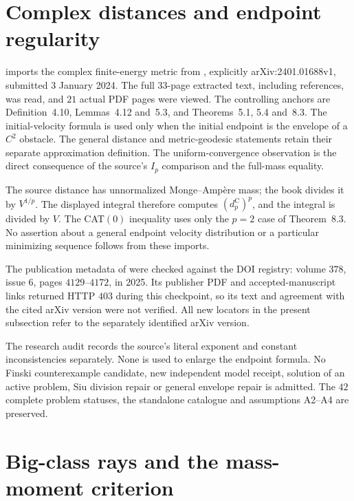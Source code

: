 \section{Complex distances and endpoint regularity}
\label{sec:provenance-complex-geodesic-regularity}

 imports the complex
finite-energy metric from \cite{Gupta24GeodesicV1}, explicitly
arXiv:2401.01688v1, submitted 3 January 2024. The full $33$-page
extracted text, including references, was read, and $21$ actual
PDF pages were viewed. The controlling anchors are
Definition~4.10, Lemmas~4.12 and~5.3, and Theorems~5.1, 5.4
and~8.3. The initial-velocity formula is used only when the
initial endpoint is the envelope of a $C^2$ obstacle. The
general distance and metric-geodesic statements retain their
separate approximation definition. The uniform-convergence
observation is the direct consequence of the source's
$I_p$ comparison and the full-mass equality.

The source distance has unnormalized Monge--Amp\`ere mass;
the book divides it by $V^{1/p}$. The displayed integral
therefore computes $(d_p^{\mathrm C})^p$, and the integral
is divided by $V$. The CAT$(0)$ inequality uses only the
$p=2$ case of Theorem~8.3. No assertion about a general
endpoint velocity distribution or a particular minimizing
sequence follows from these imports.

The publication metadata of \cite{Gup24} were checked against
the DOI registry: volume $378$, issue $6$, pages $4129$--$4172$,
in 2025. Its publisher PDF and accepted-manuscript links
returned HTTP $403$ during this checkpoint, so its text and
agreement with the cited arXiv version were not verified.
All new locators in the present subsection refer to the
separately identified arXiv version.

The research audit records the source's literal exponent
and constant inconsistencies separately. None is used to
enlarge the endpoint formula. No Finski counterexample
candidate, new independent model receipt, solution of an
active problem, Siu division repair or general envelope
repair is admitted. The $42$ complete problem statuses,
the standalone catalogue and assumptions A2--A4 are preserved.

\section{Big-class rays and the mass-moment criterion}
\label{sec:provenance-big-ray-mass-moment}

